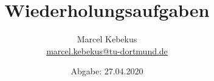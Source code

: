 

\title{Wiederholungsaufgaben}
\author{%
  Marcel Kebekus\\%
  \href{mailto:marcel.kebekus@tu-dortmund.de}{marcel.kebekus@tu-dortmund.de}%
}
\date{%
  Abgabe: 27.04.2020 
}
\makeatletter         
\def\@maketitle{
\raggedright
\texttt{[image: bilder/lo\_TU-Do 2008/logo\_rgb\_jpg]}\\[8ex]
\begin{center}
{\Huge \bfseries \sffamily \@title }\\[4ex] 
{\Large  \@author}\\[4ex] 
\@date\\[8ex]
\publishers\\
\end{center}}





\maketitle
\thispagestyle{empty}
\newpage


\newpage




